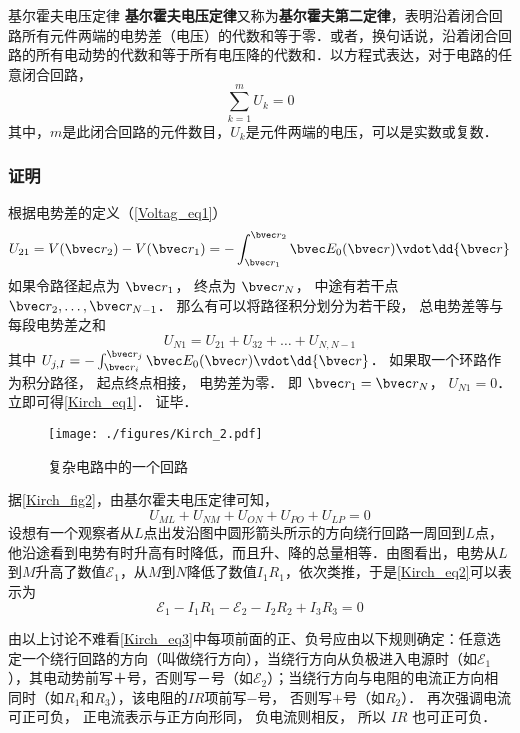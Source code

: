 \begin{theorem}{基尔霍夫电压定律}
\textbf{基尔霍夫电压定律}又称为\textbf{基尔霍夫第二定律}，表明沿着闭合回路所有元件两端的电势差（电压）的代数和等于零．或者，换句话说，沿着闭合回路的所有电动势的代数和等于所有电压降的代数和．以方程式表达，对于电路的任意闭合回路，
\begin{equation}\label{Kirch_eq1}
\sum_{k=1}^m U_k = 0
\end{equation}
其中，$m$是此闭合回路的元件数目，$U_k$是元件两端的电压，可以是实数或复数．
\end{theorem}

\subsubsection{证明}
根据电势差的定义（\autoref{Voltag_eq1}）
\begin{equation}
U_{21} = V(\bvec r_2) - V(\bvec r_1) = - \int_{\bvec r_1}^{\bvec r_2} \bvec E_0(\bvec r) \vdot \dd{\bvec r}
\end{equation}
如果令路径起点为 $\bvec r_1$， 终点为 $\bvec r_N$， 中途有若干点 $\bvec r_2, \dots, \bvec r_{N-1}$． 那么有可以将路径积分划分为若干段， 总电势差等与每段电势差之和
\begin{equation}
U_{N1} = U_{21} + U_{32} + \dots + U_{N, N-1}
\end{equation}
其中 $U_{j, I} = - \int_{\bvec r_i}^{\bvec r_{j}} \bvec E_0(\bvec r) \vdot \dd{\bvec r}$．
如果取一个环路作为积分路径， 起点终点相接， 电势差为零． 即 $\bvec r_1 = \bvec r_N$， $U_{N1} = 0$． 立即可得\autoref{Kirch_eq1}． 证毕．

\begin{example}{}
\begin{figure}[ht]
\centering
\texttt{[image: ./figures/Kirch\_2.pdf]}
\caption{复杂电路中的一个回路} \label{Kirch_fig2}
\end{figure}

据\autoref{Kirch_fig2}，由基尔霍夫电压定律可知，
\begin{equation} \label{Kirch_eq2}
U_{M L}+U_{N M}+U_{O N}+U_{P O}+U_{L P}=0
\end{equation}
设想有一个观察者从$L$点出发沿图中圆形箭头所示的方向绕行回路一周回到$L $点，他沿途看到电势有时升高有时降低，而且升、降的总量相等．由图看出，电势从$L $到$M $升高了数值$\mathscr E_1$，从$M $到$N $降低了数值$I_1R_1$，依次类推，于是\autoref{Kirch_eq2}可以表示为
\begin{equation}\label{Kirch_eq3}
\mathscr{E}_{1}-I_{1} R_{1}-\mathscr{E}_{2}-I_{2} R_{2}+I_{3} R_{3}=0
\end{equation}

由以上讨论不难看\autoref{Kirch_eq3}中每项前面的正、负号应由以下规则确定：任意选定一个绕行回路的方向（叫做绕行方向），当绕行方向从负极进入电源时（如$\mathscr E_1$），其电动势前写$＋$号，否则写$－$号（如$\mathscr
E_2$）；当绕行方向与电阻的电流正方向相同时（如$R_1$和$R_3$），该电阻的$IR$项前写$-$号， 否则写$+$号（如$R_2$）． 再次强调电流可正可负， 正电流表示与正方向形同， 负电流则相反， 所以 $IR$ 也可正可负．
\end{example}


